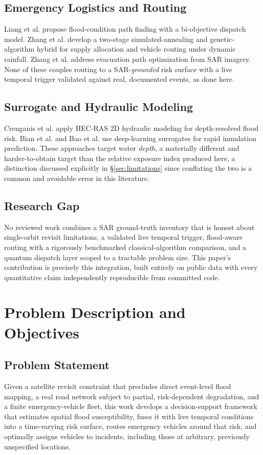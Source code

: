 \documentclass[conference]{IEEEtran}
\begin{document}
\subsection{Emergency Logistics and Routing}
Liang et al. \cite{liang2024} propose flood-condition path finding with a bi-objective dispatch model. Zhang et al. \cite{zhang2025logistics} develop a two-stage simulated-annealing and genetic-algorithm hybrid for supply allocation and vehicle routing under dynamic rainfall. Zhang et al. \cite{zhang2025sar} address evacuation path optimization from SAR imagery. None of these couples routing to a SAR-\emph{grounded} risk surface with a live temporal trigger validated against real, documented events, as done here.

\subsection{Surrogate and Hydraulic Modeling}
Crenganis et al. \cite{crenganis2025} apply HEC-RAS 2D hydraulic modeling for depth-resolved flood risk. Bian et al. \cite{bian2025} and Bao et al. \cite{bao2025} use deep-learning surrogates for rapid inundation prediction. These approaches target water \emph{depth}, a materially different and harder-to-obtain target than the relative exposure index produced here, a distinction discussed explicitly in \S\ref{sec:limitations} since conflating the two is a common and avoidable error in this literature.

\subsection{Research Gap}
No reviewed work combines a SAR ground-truth inventory that is honest about single-orbit revisit limitations, a validated live temporal trigger, flood-aware routing with a rigorously benchmarked classical-algorithm comparison, and a quantum dispatch layer scoped to a tractable problem size. This paper's contribution is precisely this integration, built entirely on public data with every quantitative claim independently reproducible from committed code.

\section{Problem Description and Objectives}

\subsection{Problem Statement}
Given a satellite revisit constraint that precludes direct event-level flood mapping, a real road network subject to partial, risk-dependent degradation, and a finite emergency-vehicle fleet, this work develops a decision-support framework that estimates spatial flood susceptibility, fuses it with live temporal conditions into a time-varying risk surface, routes emergency vehicles around that risk, and optimally assigns vehicles to incidents, including those at arbitrary, previously unspecified locations.
\end{document}
